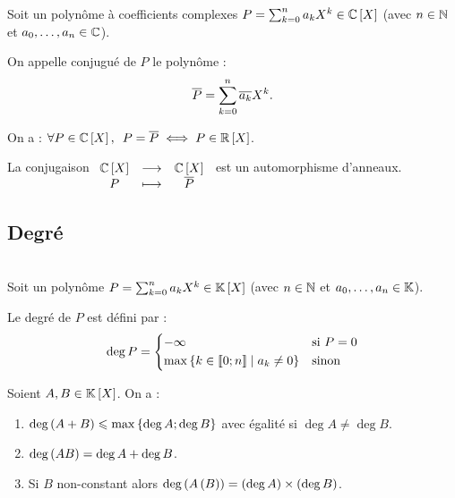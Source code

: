 \begin{defi}[Conjugaison]
Soit un polynôme à coefficients complexes \(P=\sum_{k=0}^{n}a_kX^k\in\poly[\C]\) (avec \(n\in\mathbb{N}\) et \(a_0,\dots,a_n\in\mathbb{C}\)).

On appelle conjugué de \(P\) le polynôme : \[\overline{P}=\sum_{k=0}^{n}\overline{a_k}X^k.\]
\end{defi}

\begin{rem}
On a : \(\quantifs{\forall P\in\poly[\C]}P=\conj{P}\ssi P\in\poly[\R]\).
\end{rem}

\begin{prop}
La conjugaison \(\fonctionlambda{\poly[\C]}{\poly[\C]}{P}{\conj{P}}\) est un automorphisme d'anneaux.
\end{prop}

\begin{dem}
\end{dem}

\subsection{Degré}

\begin{defi}~\\
Soit un polynôme \(P=\sum_{k=0}^{n}a_kX^k\in\poly\) (avec \(n\in\mathbb{N}\) et \(a_0,\dots,a_n\in\mathbb{K}\)).

Le degré de \(P\) est défini par : \[\deg P=\begin{dcases}-\infty&\text{si }P=0 \\ \max\left\lbrace k\in\left\llbracket0;n\right\rrbracket\;\middle|\; a_k\not=0\right\rbrace&\text{sinon}\end{dcases}\]
\end{defi}

\begin{prop}
Soient \(A,B\in\poly\). On a :

\begin{enumerate}
\item \(\deg\left(A+B\right)\leqslant\max\left\lbrace\deg A;\deg B\right\rbrace\) avec égalité si \(\deg A\not=\deg B\). \\

\item \(\deg\left(AB\right)=\deg A+\deg B\). \\

\item Si \(B\) non-constant alors \(\deg \left(A\left(B\right)\right)=\left(\deg A\right)\times\left(\deg B\right)\). \\
\end{enumerate}
\end{prop}

